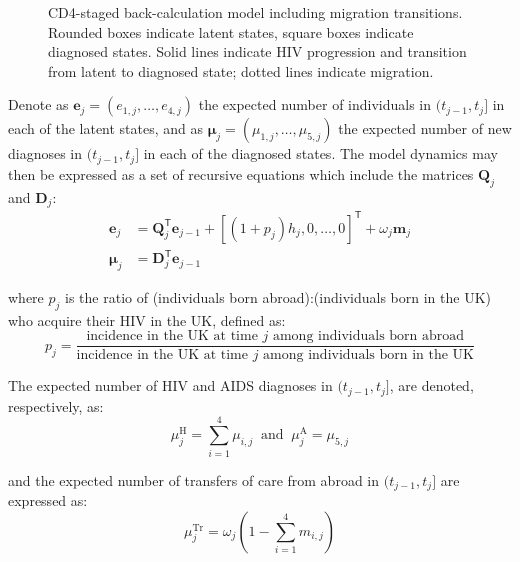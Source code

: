 \documentclass[11pt, a4paper]{article}
\begin{document}
\begin{figure}[htbp!]
  \caption{CD4-staged back-calculation model including migration transitions. Rounded boxes indicate latent states, square boxes indicate diagnosed states. Solid lines indicate HIV progression and transition from latent to diagnosed state; dotted lines indicate migration.}\label{fig:back-calc-migration}
\end{figure}

Denote as $\bm{e}_j = (e_{1,j},\dots,e_{4,j})$ the expected number of individuals in $(t_{j-1},t_j]$ in each of the latent states, and as $\bm{\mu}_j = (\mu_{1,j},\dots,\mu_{5,j})$ the expected number of new diagnoses in $(t_{j-1},t_j]$ in each of the diagnosed states. The model dynamics may then be expressed as a set of recursive equations which include the matrices $\mathbf{Q}_j$ and $\mathbf{D}_j$:
%
\begin{align*}
  \bm{e}_j   & = \mathbf{Q}_j^\mathsf{T} \bm{e}_{j-1} + {[(1 + p_j)h_j, 0, \ldots,0]}^\mathsf{T} + \omega_j\bm{m}_j \\
  \bm{\mu}_j & = \mathbf{D}_j^\mathsf{T} \bm{e}_{j-1}
\end{align*}

where $p_j$ is the ratio of (individuals born abroad):(individuals born in the UK) who acquire their HIV in the UK, defined as:
%
\[
    p_j = \frac{\text{incidence in the UK at time $j$ among individuals born abroad}}{\text{incidence in the UK at time $j$ among individuals born in the UK}}
\]

The expected number of HIV and AIDS diagnoses in $(t_{j-1},t_j]$, are denoted, respectively, as:
%
\[
  \mu_j^\text{H} = \sum_{i=1}^4{\mu_{i,j}} \: \text{ and } \:
  \mu_j^\text{A} = \mu_{5,j}
\]

and the expected number of transfers of care from abroad in $(t_{j-1},t_j]$ are expressed as:
%
\[
  \mu^\text{Tr}_j = \omega_j (1-\sum_{i=1}^4 m_{i,j})
\]
\end{document}
